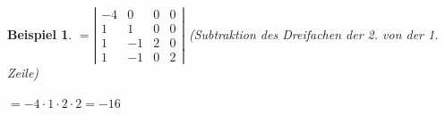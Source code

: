 \documentclass[a4paper,10pt]{report}
\newtheorem{myexample}{Beispiel}
\begin{document}
\begin{myexample}
\vspace{0.4cm}

\hspace{0.8cm}  $ = \left | \begin {array}{rrrr}  -4 & 0 & 0  & 0\\
                                1 & 1 & 0 & 0\\
                                1 & -1 & 2 & 0\\
                                1 & -1 & 0 & 2 \end{array} \right
                                |$ (Subtraktion des Dreifachen der 2. von der 1. Zeile)

\vspace{0.4cm}

\hspace{0.8cm}  $= -4 \cdot 1 \cdot 2 \cdot 2 = -16$
\end{myexample}
\newpage
\end{document}
